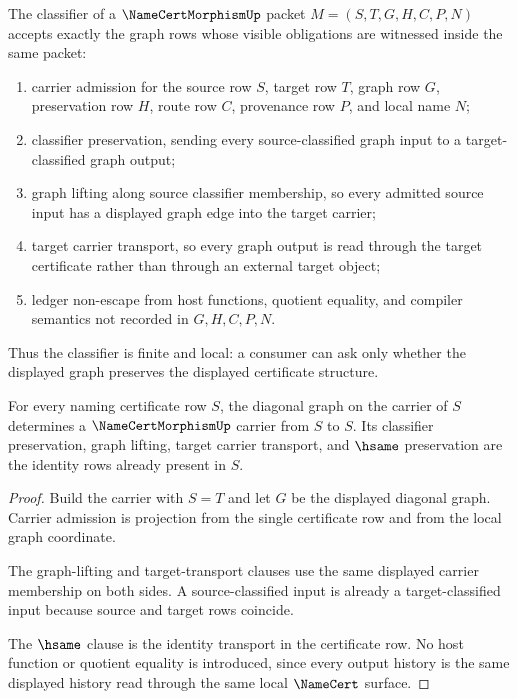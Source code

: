 \begin{definition}
\label{def:namecert-morphism-classifier}
The classifier of a $\NameCertMorphismUp$ packet $M=(S,T,G,H,C,P,N)$ accepts exactly the graph rows whose visible obligations are witnessed inside the same packet:
\begin{enumerate}
\item carrier admission for the source row $S$, target row $T$, graph row $G$, preservation row $H$, route row $C$, provenance row $P$, and local name $N$;
\item classifier preservation, sending every source-classified graph input to a target-classified graph output;
\item graph lifting along source classifier membership, so every admitted source input has a displayed graph edge into the target carrier;
\item target carrier transport, so every graph output is read through the target certificate rather than through an external target object;
\item ledger non-escape from host functions, quotient equality, and compiler semantics not recorded in $G,H,C,P,N$.
\end{enumerate}
Thus the classifier is finite and local: a consumer can ask only whether the displayed graph preserves the displayed certificate structure.
\end{definition}

\begin{theorem}
\label{thm:namecert-morphism-identity-obligation}
For every naming certificate row $S$, the diagonal graph on the carrier of $S$ determines a $\NameCertMorphismUp$ carrier from $S$ to $S$. Its classifier preservation, graph lifting, target carrier transport, and $\hsame$ preservation are the identity rows already present in $S$.
\end{theorem}

\begin{proof}
Build the carrier with $S=T$ and let $G$ be the displayed diagonal graph. Carrier admission is projection from the single certificate row and from the local graph coordinate.

The graph-lifting and target-transport clauses use the same displayed carrier membership on both sides. A source-classified input is already a target-classified input because source and target rows coincide.

The $\hsame$ clause is the identity transport in the certificate row. No host function or quotient equality is introduced, since every output history is the same displayed history read through the same local $\NameCert$ surface.
\end{proof}

